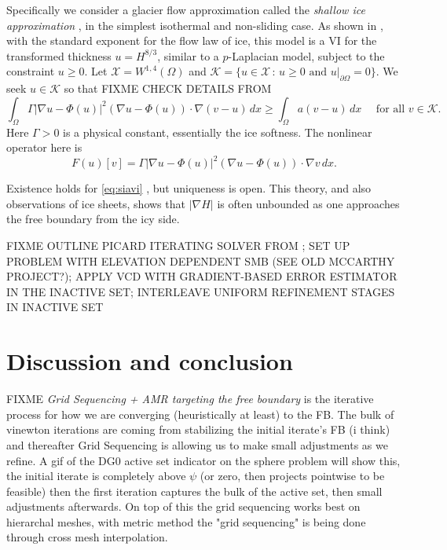 \documentclass[]{interact}
\theoremstyle{plain}%
\theoremstyle{definition}
\theoremstyle{remark}
\newcommand{\grad}{\nabla}
\newcommand{\cK}{\mathcal{K}}
\newcommand{\cX}{\mathcal{X}}
\begin{document}
Specifically we consider a glacier flow approximation called the \emph{shallow ice approximation} \cite{GreveBlatter2009}, in the simplest isothermal and non-sliding case.   As shown in \cite{JouvetBueler2012}, with the standard exponent for the flow law of ice, this model is a VI for the transformed thickness $u=H^{8/3}$, similar to a $p$-Laplacian model, subject to the constraint $u\ge 0$.  Let $\cX = W^{1,4}(\Omega)$ and $\cK = \{u \in \cX\,:\,u\ge 0 \text{ and } u|_{\partial\Omega}=0\}$.  We seek $u\in\cK$ so that  FIXME CHECK DETAILS FROM \cite{JouvetBueler2012}
\begin{equation}
\int_\Omega \Gamma |\grad u - \Phi(u)|^2 (\grad u - \Phi(u)) \cdot \grad (v-u) \,dx \ge \int_\Omega a (v-u)\,dx \quad \text{ for all } v \in \cK. \label{eq:siavi}
\end{equation}
Here $\Gamma>0$ is a physical constant, essentially the ice softness.  The nonlinear operator here is
\begin{equation}
F(u)[v] = \Gamma |\grad u - \Phi(u)|^2 (\grad u - \Phi(u)) \cdot \grad v \,dx. \label{eq:siaoperator}
\end{equation}

Existence holds for \eqref{eq:siavi} \cite{JouvetBueler2012}, but uniqueness is open.  This theory, and also observations of ice sheets, shows that $|\grad H|$ is often unbounded as one approaches the free boundary from the icy side.

FIXME OUTLINE PICARD ITERATING SOLVER FROM \cite{JouvetBueler2012}; SET UP PROBLEM WITH ELEVATION DEPENDENT SMB (SEE OLD MCCARTHY PROJECT?); APPLY VCD WITH GRADIENT-BASED ERROR ESTIMATOR IN THE INACTIVE SET; INTERLEAVE UNIFORM REFINEMENT STAGES IN INACTIVE SET


\section{Discussion and conclusion} \label{sec:conclusion}

FIXME \emph{Grid Sequencing + AMR targeting the free boundary} is the iterative process for how we are converging (heuristically at least) to the FB.  The bulk of vinewton iterations are coming from stabilizing the initial iterate's FB (i think) and thereafter Grid Sequencing is allowing us to make small adjustments as we refine.  A gif of the DG0 active set indicator on the sphere problem will show this, the initial iterate is completely above $\psi$ (or zero, then  projects pointwise to be feasible) then the first iteration captures the bulk of the active set, then small adjustments afterwards. On top of this the grid sequencing works best on hierarchal meshes, with metric method  the "grid sequencing" is being done through cross mesh interpolation.
\end{document}
